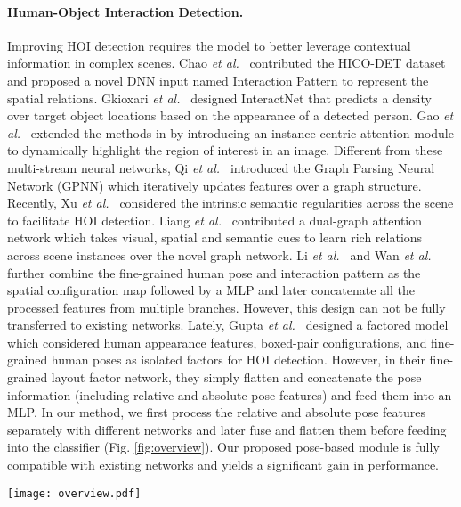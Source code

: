 \documentclass[10pt,twocolumn,letterpaper]{article}
\newcommand{\et}{{\em et al.\ }}
\begin{document}
\paragraph{\textbf{Human-Object Interaction Detection.}}
Improving HOI detection requires the model to better leverage contextual information in complex scenes. Chao \et \cite{chao2018learning} contributed the HICO-DET dataset and proposed a novel DNN input named Interaction Pattern to represent the spatial relations. Gkioxari \et \cite{gkioxari2018detecting} designed InteractNet that predicts a density over target object locations based on the appearance of a detected person. Gao \et \cite{gao2018ican} extended the methods in \cite{chao2018learning,gkioxari2018detecting} by introducing an instance-centric attention module to dynamically highlight the region of interest in an image. Different from these multi-stream neural networks, Qi \et \cite{qi2018learning} introduced the Graph Parsing Neural Network (GPNN) which iteratively updates features over a graph structure. Recently, Xu \et \cite{xu2019learning} considered the intrinsic semantic regularities across the scene to facilitate HOI detection. Liang \et \cite{liang2020visualsemantic} contributed a dual-graph attention network which takes visual, spatial and semantic cues to learn rich relations across scene instances over the novel graph network. Li \et \cite{Li_2019_CVPR} and Wan \et \cite{wan2019pose} further combine the fine-grained human pose and interaction pattern \cite{chao2018learning} as the spatial configuration map followed by a MLP and later concatenate all the processed features from multiple branches. However, this design can not be fully transferred to existing networks. Lately, Gupta \et \cite{gupta2018nofrills} designed a factored model which considered human appearance features, boxed-pair configurations, and fine-grained human poses as isolated factors for HOI detection. However, in their fine-grained layout factor network, they simply flatten and concatenate the pose information (including relative and absolute pose features) and feed them into an MLP. In our method, we first process the relative and absolute pose features separately with different networks and later fuse and flatten them before feeding into the classifier (Fig. \ref{fig:overview}). Our proposed pose-based module is fully compatible with existing networks and yields a significant gain in performance.


\begin{figure*}
    \centering
    \texttt{[image: overview.pdf]}
    \caption{\textbf{Framework Overview}. Our system consists of two streams: a) an existing HOI detection network for inference based on supplied cues \textit{(e.g.} visual, spatial, semantic.); b) our proposed pose-based modular network that extends the top branch for better contextualization with absolute and relative pose cues. 
    The bottom half of the diagram depicts the pose-based network design in detail.}
    \label{fig:overview}
\end{figure*}
\end{document}
